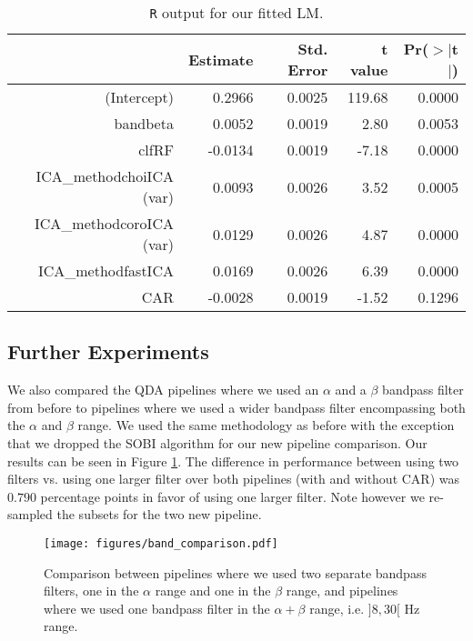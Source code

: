 	\begin{table}
		\centering
		\begin{small}
		\begin{tabular}{rrrrr}
			\hline
 			& Estimate & Std. Error & t value & Pr($>$$|$t$|$) \\ 
  			\hline
			(Intercept) & 0.2966 & 0.0025 & 119.68 & 0.0000 \\ 
  			bandbeta & 0.0052 & 0.0019 & 2.80 & 0.0053 \\ 
  			clfRF & -0.0134 & 0.0019 & -7.18 & 0.0000 \\ 
  			ICA\_methodchoiICA (var) & 0.0093 & 0.0026 & 3.52 & 0.0005 \\ 
  			ICA\_methodcoroICA (var) & 0.0129 & 0.0026 & 4.87 & 0.0000 \\ 
  			ICA\_methodfastICA & 0.0169 & 0.0026 & 6.39 & 0.0000 \\ 
  			CAR & -0.0028 & 0.0019 & -1.52 & 0.1296 \\ 
   			\hline
		\end{tabular}
		\end{small}
		\caption{\texttt{R} output for our fitted LM.}
		\label{tab:glm-output}
\end{table}

\subsection{Further Experiments}

	We also compared the QDA pipelines where we used an $\alpha$ and a $\beta$ bandpass filter from before to pipelines where we used a wider bandpass filter encompassing both the $\alpha$ and $\beta$ range. We used the same methodology as before with the exception that we dropped the SOBI algorithm for our new pipeline comparison. Our results can be seen in Figure \ref{fig:band_comparison}. The difference in performance between using two filters vs. using one larger filter over both pipelines (with and without CAR) was $0.790$ percentage points in favor of using one larger filter. Note however we re-sampled the subsets for the two new pipeline.

	\begin{figure}
		\center
			\texttt{[image: figures/band\_comparison.pdf]}
			\caption{Comparison between pipelines where we used two separate bandpass filters, one in the $\alpha$ range and one in the $\beta$ range, and pipelines where we used one bandpass filter in the $\alpha + \beta$ range, i.e. $]8,30[$ Hz range.}
		\label{fig:band_comparison}
	\end{figure}

